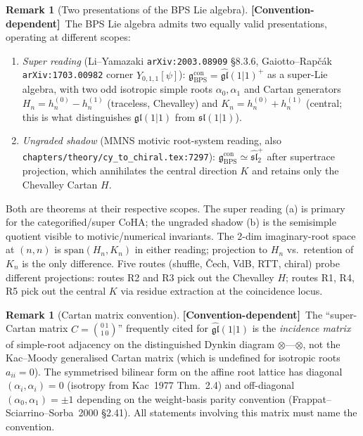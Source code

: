 \documentclass[11pt]{amsart}
\theoremstyle{definition}
\newtheorem{remark}[theorem]{Remark}
\providecommand{\fgl}{\mathfrak{gl}}
\providecommand{\fsl}{\mathfrak{sl}}
\providecommand{\fg}{\mathfrak{g}}
\providecommand{\ClaimStatusConventionDependent}{\textbf{\textsf{[Convention-dependent]}}}
\begin{document}
\begin{remark}[Two presentations of the BPS Lie algebra]
\label{rem:super-vs-even}
\ClaimStatusConventionDependent\
The BPS Lie algebra admits two equally valid presentations, operating at
different scopes:
\begin{enumerate}[label=\emph{(\alph*)}, leftmargin=2em]
\item \emph{Super reading} (Li--Yamazaki \texttt{arXiv:2003.08909} §8.3.6,
  Gaiotto--Rapčák \texttt{arXiv:1703.00982} corner $Y_{0,1,1}[\psi]$):
  $\fg_{\mathrm{BPS}}^{\mathrm{con}} = \widehat{\fgl}(1|1)^+$ as a super-Lie
  algebra, with two odd isotropic simple roots $\alpha_0, \alpha_1$ and
  Cartan generators $H_n = h^{(0)}_n - h^{(1)}_n$ (traceless, Chevalley)
  and $K_n = h^{(0)}_n + h^{(1)}_n$ (central; this is what distinguishes
  $\fgl(1|1)$ from $\fsl(1|1)$).
\item \emph{Ungraded shadow} (MMNS motivic root-system reading, also
  \texttt{chapters/theory/cy\_to\_chiral.tex:7297}):
  $\fg_{\mathrm{BPS}}^{\mathrm{con}} \simeq \widehat{\fsl}_2^+$ after
  supertrace projection, which annihilates the central direction $K$ and
  retains only the Chevalley Cartan $H$.
\end{enumerate}
Both are theorems at their respective scopes. The super reading (a) is
primary for the categorified/super CoHA; the ungraded shadow (b) is the
semisimple quotient visible to motivic/numerical invariants. The 2-dim
imaginary-root space at $(n,n)$ is $\mathrm{span}(H_n, K_n)$ in either
reading; projection to $H_n$ vs.\ retention of $K_n$ is the only
difference. Five routes (shuffle, \v{C}ech, VdB, RTT, chiral) probe different
projections: routes R2 and R3 pick out the Chevalley $H$;
routes R1, R4, R5 pick out the central $K$ via residue extraction at
the coincidence locus.
\end{remark}

\begin{remark}[Cartan matrix convention]
\label{rem:cartan-convention}
\ClaimStatusConventionDependent\
The ``super-Cartan matrix $C = \binom{0\,1}{1\,0}$'' frequently cited for
$\widehat{\fgl}(1|1)$ is the \emph{incidence matrix} of simple-root
adjacency on the distinguished Dynkin diagram $\otimes$---$\otimes$, not
the Kac--Moody generalised Cartan matrix (which is undefined for isotropic
roots $a_{ii} = 0$). The symmetrised bilinear form on the affine root
lattice has diagonal $(\alpha_i, \alpha_i) = 0$ (isotropy from
Kac~1977 Thm.~2.4) and off-diagonal $(\alpha_0, \alpha_1) = \pm 1$
depending on the weight-basis parity convention
(Frappat--Sciarrino--Sorba~2000 §2.41). All statements involving this
matrix must name the convention.
\end{remark}
\end{document}
